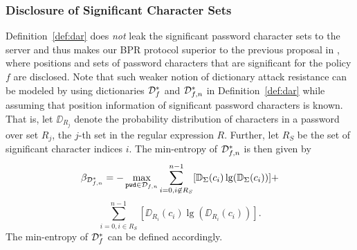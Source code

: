 
\subsubsection{Disclosure of Significant Character Sets} %
Definition~\ref{def:dar} does \emph{not} leak the significant password character sets to the server and thus makes our BPR protocol superior to the previous proposal in \cite{KieferM14}, where positions and sets of password characters that are significant for the policy $f$ are disclosed. Note that such weaker notion of dictionary attack resistance can be modeled by using dictionaries $\mathcal{D}_{f}^\ast$ and $\mathcal{D}_{f,n}^\ast$ in Definition~\ref{def:dar} while assuming that position information of significant password characters is known. That is,
let $\DD_{R_j}$ denote the probability distribution of characters in a password \pwd over set $R_j$, the $j$-th set in the regular expression $R$.
Further, let $R_S$ be the set of significant character indices $i$.
The min-entropy of $\mathcal{D}_{f,n}^\ast$ is then given by
\[\beta_{\mathcal{D}^\ast_{f,n}} = -\max_{\mathtt{pwd}\in \mathcal{D}_{f,n}} \sum_{i=0, i\not\in R_S}^{n-1} [\mathbb{D}_\Sigma(c_i)\lg(\mathbb{D}_\Sigma(c_i))] +\]
\[ \sum_{i=0, i\in R_S}^{n-1} [\DD_{R_i}(c_i)\lg(\DD_{R_i}(c_i))].\]
The min-entropy of $\mathcal{D}_{f}^\ast$ can be defined accordingly.

